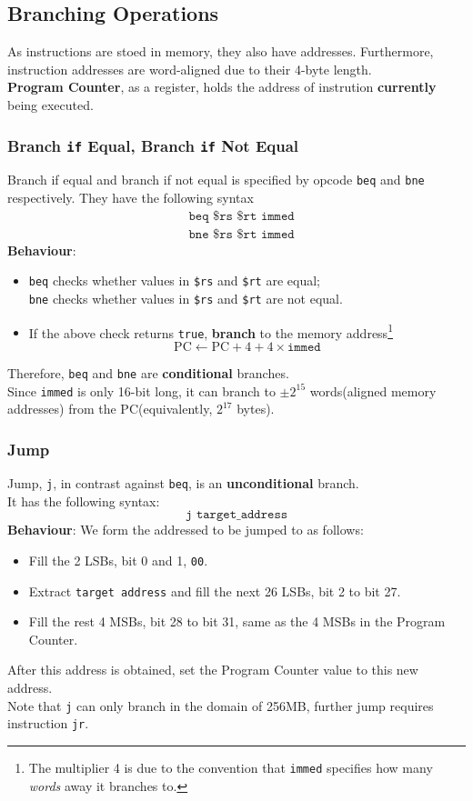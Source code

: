 \documentclass[12pt]{article}
\theoremstyle{definition}
\begin{document}
\subsection{Branching Operations}
As instructions are stoed in memory, they also have addresses. Furthermore, instruction addresses are word-aligned due to their 4-byte length. \\\textbf{Program Counter}, as a register, holds the address of instrution \textbf{currently} being executed.\\
\subsubsection{Branch \texttt{if} Equal, Branch \texttt{if} Not Equal}
Branch if equal and branch if not equal is specified by opcode \texttt{beq} and \texttt{bne} respectively. They have the following syntax
\begin{align*}
&\texttt{beq \$rs \$rt immed}\\
&\texttt{bne \$rs \$rt immed}
\end{align*}
\textbf{Behaviour}:\\
\begin{itemize}
  \item \texttt{beq} checks whether values in \texttt{\$rs} and \texttt{\$rt} are equal;\\
  \texttt{bne} checks whether values in \texttt{\$rs} and \texttt{\$rt} are not equal.
  \item If the above check returns \texttt{true}, \textbf{branch} to the memory address\footnote{The multiplier 4 is due to the convention that \texttt{immed} specifies how many \textit{words} away it branches to.}
  \[
\text{PC}\leftarrow \text{PC}+4+4\times\texttt{immed}
  \]
\end{itemize}
Therefore, \texttt{beq} and \texttt{bne} are \textbf{conditional} branches.\\
Since \texttt{immed} is only 16-bit long, it can branch to $\pm 2^{15}$ words(aligned memory addresses) from the PC(equivalently, $2^{17}$ bytes).
\subsubsection{Jump}
Jump, \texttt{j}, in contrast against \texttt{beq}, is an \textbf{unconditional} branch.\\
It has the following syntax:
\[
\texttt{j target\_address}
\]
\textbf{Behaviour}: We form the addressed to be jumped to as follows:
\begin{itemize}
  \item Fill the 2 LSBs, bit 0 and 1, \texttt{00}.%
  \item Extract \texttt{target address} and fill the next 26 LSBs, bit 2 to bit 27.
  \item Fill the rest 4 MSBs, bit 28 to bit 31, same as the 4 MSBs in the Program Counter.
\end{itemize}
After this address is obtained, set the Program Counter value to this new address.\\
Note that \texttt{j} can only branch in the domain of 256MB, further jump requires instruction \texttt{jr}.
\end{document}
